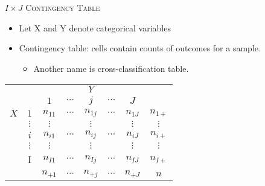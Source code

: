 \documentclass[dvipdfmx, serif,handout]{beamer}
\begin{document}
\begin{frame}{\textsc{$I \times J$ Contingency Table}}
	\begin{itemize}
		\item Let X and Y denote categorical variables
		\item Contingency table: cells contain counts of outcomes for a sample.
		      \begin{itemize}
			      \item  Another name is cross-classification table.
		      \end{itemize}
	\end{itemize}

	\centering
	\begin{tabular}{cc|ccccc|c}
		\hline
		    &          & \multicolumn{5}{c|}{$Y$} &                                                              \\
		    &          & {$1$}                    & {$\cdots$} & {$j$}      & {$\cdots$} & {$J$}      &          \\\hline
		$X$ & $1$      & $n_{11}$                 & $\cdots$   & $n_{1j}$   & $\cdots$   & $n_{1J}$   & $n_{1+}$ \\
		    & $\vdots$ & $\vdots$                 &            & $\vdots$   &            & $\vdots$   & $\vdots$ \\
		    & {$i$}    & {$n_{i1}$}               & {$\cdots$} & {$n_{ij}$} & {$\cdots$} & {$n_{iJ}$} & $n_{i+}$ \\
		    & $\vdots$ & $\vdots$                 &            & $\vdots$   &            & $\vdots$   & $\vdots$ \\
		    & I        & $n_{I1}$                 & $\cdots$   & $n_{Ij}$   & $\cdots$   & $n_{IJ}$   & $n_{I+}$ \\\hline
		    &          & $n_{+1}$                 & $\cdots$   & $n_{+j}$   & $\cdots$   & $n_{+J}$   & $n$      \\
	\end{tabular}
\end{frame}
\end{document}
